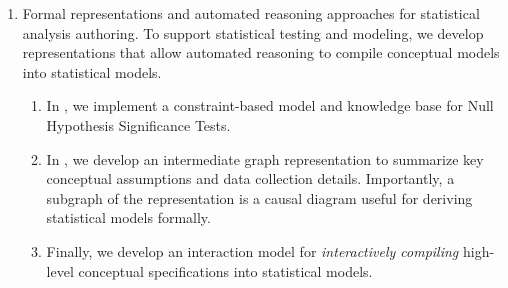 \begin{enumerate}
    \item Formal representations and automated reasoning approaches for
    statistical analysis authoring. To support statistical testing and modeling,
    we develop representations that allow automated reasoning to compile
    conceptual models into statistical models. 
    \begin{enumerate}
        \item In \tea, we implement a constraint-based model and knowledge base
        for Null Hypothesis Significance Tests. 
        \item In \tisane, we develop an intermediate graph representation to
        summarize key conceptual assumptions and data collection details.
        Importantly, a subgraph of the representation is a causal diagram useful
        for deriving statistical models formally. 
        \item Finally, we develop an interaction model for \textit{interactively
        compiling} high-level conceptual specifications into statistical models.
    \end{enumerate}
\end{enumerate}

